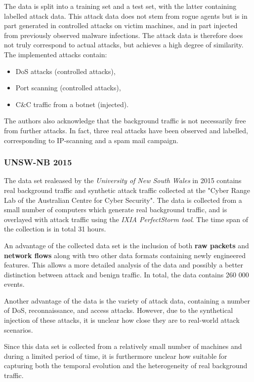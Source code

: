 \documentclass[a4paper,12pt,twoside]{report}
\begin{document}
The data is split into a training set and a test set, with the latter containing labelled attack data. This attack data does not stem from rogue agents but is in part generated in controlled attacks on victim machines, and in part injected from previously observed malware infections. The attack data is therefore does not truly correspond to actual attacks, but achieves a high degree of similarity. The implemented attacks contain:
\begin{itemize}
\item DoS attacks (controlled attacks),
\item Port scanning (controlled attacks),
\item C\&C traffic from a botnet (injected).
\end{itemize}

The authors also acknowledge that the background traffic is not necessarily free from further attacks. In fact, three real attacks have been observed and labelled, corresponding to IP-scanning and a spam mail campaign.

\subsubsection*{UNSW-NB 2015 \cite{moustafa_unsw-nb15:_2015}}

The data set realeased by the \textit{University of New South Wales} in 2015 contains real background traffic and synthetic attack traffic collected at the "Cyber Range Lab of the Australian Centre for Cyber Security". The data is collected from a small number of computers which generate real background traffic, and is overlayed with attack traffic using the \textit{IXIA PerfectStorm tool}. The time span of the collection is in total 31 hours.

An advantage of the collected data set is the inclusion of both \textbf{raw packets} and \textbf{network flows} along with two other data formats containing newly engineered features. This allows a more detailed analysis of the data and possibly a better distinction between attack and benign traffic. In total, the data contains 260 000 events.

Another advantage of the data is the variety of attack data, containing a number of DoS, reconnaissance, and access attacks. However, due to the synthetical injection of these attacks, it is unclear how close they are to real-world attack scenarios.

Since this data set is collected from a relatively small number of machines and during a limited period of time, it is furthermore unclear how suitable for capturing both the temporal evolution and the heterogeneity of real background traffic.
\end{document}
